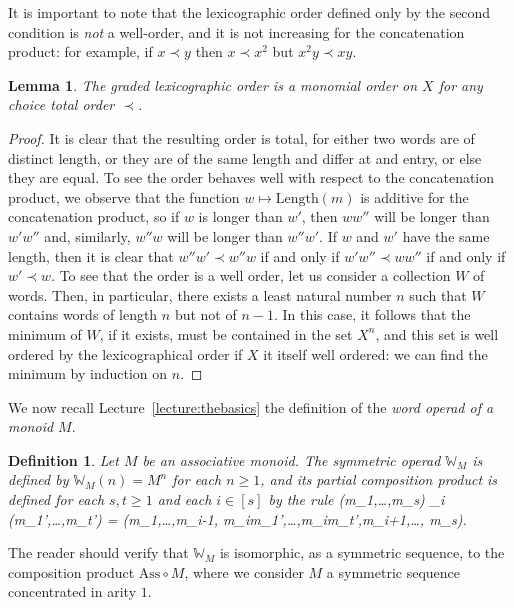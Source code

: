 \documentclass[fleqn, a4paper, twoside]{article}
\makeatletter
\newcommand{\0}{\langle 0\rangle}
\let\[\@undefined
\DeclareRobustCommand{\[}{\begin{equation}}%
\let\]\@undefined
\DeclareRobustCommand{\]}{\end{equation}}%
\theoremstyle{mytheorem}
\newtheorem{lemma}[theorem]{Lemma}
\theoremstyle{introthm}
\theoremstyle{mydefinition}
\newtheorem{definition}[theorem]{Definition}
\theoremstyle{mydefinition2}
\theoremstyle{plain} %
\newcommand{\?}{\,?\,}
\theoremstyle{mytheorem}
\theoremstyle{plain} %
\makeatother
\begin{document}
It is important to note that the lexicographic order defined only
by the second condition is \emph{not} a well-order, and it is 
not increasing for the concatenation product: for example,
if $x\prec y$ then $x \prec x^2$ but $x^2y \prec xy$. 

\begin{lemma}
The graded lexicographic order is a monomial order on $X$
for any choice total order $\prec$.
\end{lemma}

\begin{proof}
It is clear that the resulting order is total, for either
two words are of distinct length, or they are of the same length
and differ at and entry, or else they are equal. To see the
order behaves well with respect to the concatenation product,
we observe that the function $w\longmapsto \mathrm{Length}(m)$
is additive for the concatenation product, so if $w$ is longer
than $w'$, then $ww''$ will be longer than $w'w''$ and,
similarly, $w''w$ will be longer than $w''w'$. If $w$ and 
$w'$ have the same length, then it is clear that
$w''w'\prec w''w$ if and only if $w'w''\prec ww''$ if
and only if $w' \prec w$. To see that the order is a well
order, let us consider a collection $W$ of words. Then,
in particular, there exists a least natural number $n$
such that $W$ contains words of length $n$ but not of $n-1$. 
In this case, it follows that the minimum of $W$, if it
exists, must be contained in the set $X^n$, and this
set is well ordered by the lexicographical order if
$X$ it itself well ordered: we can find the minimum 
by induction on $n$.
\end{proof}

We now recall Lecture~\ref{lecture:thebasics} the definition
of the \emph{word operad of a monoid $M$}.

\begin{definition}
Let $M$ be an associative monoid. The symmetric
operad $\mathbb W_M$ is defined by $\mathbb{W}_M(n) =
M^n$ for each $n\geqslant 1$, and its partial composition
product is defined for each $s,t\geqslant 1$ and each
$i\in [s]$ by the rule
\[(m_1,\ldots,m_s) \circ_i (m_1',\ldots,m_t') = 
 	(m_1,\ldots,m_{i-1}, m_im_1',\ldots,m_im_t',m_{i+1},\ldots, m_s).\] 
\end{definition}

The reader should verify that $\mathbb W_M$ is isomorphic,
as a symmetric sequence, to the composition product $\mathrm{Ass}\circ M$,
where we consider $M$ a symmetric sequence concentrated in arity $1$. 
\end{document}
